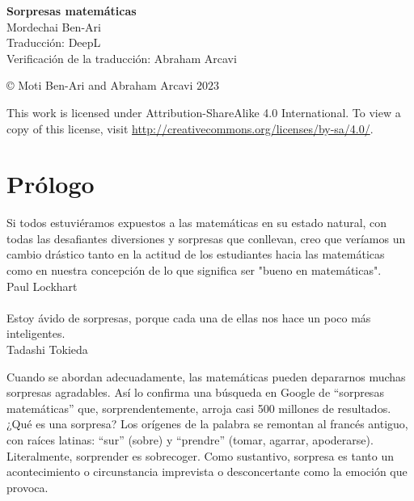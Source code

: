 
\pagestyle{empty}
\begin{center}
\textbf{\LARGE Sorpresas matemáticas}\\
\bigskip\bigskip\bigskip
\textsf{\large Mordechai Ben-Ari}\\
\bigskip\bigskip
\textsf{\large Traducción: DeepL}\\
\bigskip\bigskip
\textsf{\large Verificación de la traducción: Abraham Arcavi}
\end{center}

\vfill

\begin{center}
\copyright{} Moti Ben-Ari and Abraham Arcavi $2023$
\end{center}
 
\begin{small}
\noindent{}This work is licensed under Attribution-ShareAlike 4.0 International. To view a copy of this license, visit \url{http://creativecommons.org/licenses/by-sa/4.0/}.
\end{small}
%

\chapter*{Prólogo}

\begin{flushright}
\parbox{7cm}{
\begin{footnotesize}
\begin{flushright}
Si todos estuviéramos expuestos a las matemáticas en su estado natural, con todas las desafiantes diversiones y sorpresas que conllevan, creo que veríamos un cambio drástico tanto en la actitud de los estudiantes hacia las matemáticas como en nuestra concepción de lo que significa ser "bueno en matemáticas".\\
Paul Lockhart\mbox{}\\\mbox{}\\
Estoy ávido de sorpresas, porque cada una de ellas nos hace un poco más inteligentes.\\
Tadashi Tokieda
\end{flushright}
\end{footnotesize}
}
\end{flushright}

\medskip

Cuando se abordan adecuadamente, las matemáticas pueden depararnos muchas sorpresas agradables. Así lo confirma una búsqueda en Google de ``sorpresas matemáticas'' que, sorprendentemente, arroja casi 500 millones de resultados. ¿Qué es una sorpresa? Los orígenes de la palabra se remontan al francés antiguo, con raíces latinas: ``sur'' (sobre) y ``prendre'' (tomar, agarrar, apoderarse). Literalmente, sorprender es sobrecoger. Como sustantivo, sorpresa es tanto un acontecimiento o circunstancia imprevista o desconcertante como la emoción que provoca.


